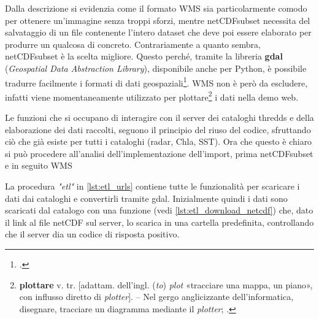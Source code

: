 \documentclass[./main.tex]{subfiles}
\begin{document}
Dalla descrizione si evidenzia come il formato WMS sia particolarmente comodo per ottenere un'immagine senza troppi sforzi, mentre netCDFsubset necessita del salvataggio di un file contenente l'intero dataset che deve poi essere elaborato per produrre un qualcosa di concreto. Contrariamente a quanto sembra, netCDFsubset è la scelta migliore. Questo perché, tramite la libreria \textbf{gdal} (\textit{Geospatial Data Abstraction Library}),  disponibile anche per Python, è possibile tradurre facilmente i formati di dati geospaziali\footcite[\url{https://gdal.org/}]{gdal-docs}. WMS non è però da escludere, infatti viene momentaneamente utilizzato per plottare\footnote{\textbf{plottare}  v. tr. [adattam. dell’ingl. (\textit{to}) \textit{plot} «tracciare una mappa, un piano», con influsso diretto di \textit{plotter}]. – Nel gergo anglicizzante dell’informatica, disegnare, tracciare un diagramma mediante il \textit{plotter}; \cite{treccani-plottare}.} i dati nella demo web.\par

Le funzioni che si occupano di interagire con il server dei cataloghi thredds e della elaborazione dei dati raccolti, seguono il principio del riuso del codice, sfruttando ciò che già esiste per tutti i cataloghi (radar, Chla, SST). Ora che questo è chiaro si può procedere all'analisi dell'implementazione dell'import, prima netCDFsubset e in seguito WMS\par

La procedura \textit{"etl"} in \autoref{lst:etl_urls} contiene tutte le funzionalità per scaricare i dati dai cataloghi e convertirli tramite gdal. Inizialmente quindi i dati sono scaricati dal catalogo con una funzione (vedi \autoref{lst:etl_download_netcdf}) che, dato il link al file netCDF sul server, lo scarica in una cartella predefinita, controllando che il server dia un codice di risposta positivo.
\end{document}
